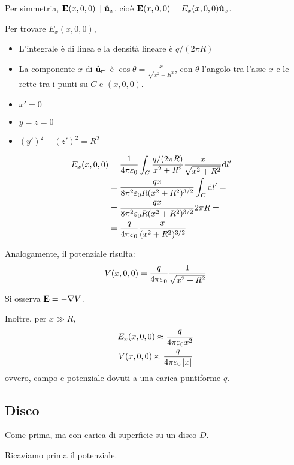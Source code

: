 Per simmetria, $\mathbf{E}(x, 0, 0) \parallel \hat{\mathbf{u}}_{x}$, cioè $\mathbf{E}(x, 0, 0) = E_x(x, 0, 0) \hat{\mathbf{u}}_{x}$.

Per trovare $E_x(x, 0, 0)$,
\begin{itemize}
    \item L'integrale è di linea e la densità lineare è $q / (2\pi R)$
    \item La componente $x$ di $\hat{\mathbf{u}}_{\mathbf{r}'}$ è $\cos \theta = \frac{x}{\sqrt{x^2 + R^2}}$, con $\theta$ l'angolo tra l'asse $x$ e le rette tra i punti su $C$ e $(x, 0, 0)$.
    \item $x' = 0$
    \item $y = z = 0$
    \item $(y')^2 + (z')^2 = R^2$
\end{itemize}

\begin{equation}
\begin{aligned}
    E_x(x, 0, 0) & = \frac{1}{4\pi\varepsilon_0} \int_C \frac{q/(2 \pi R)}{x^2 + R^2} \frac{x}{\sqrt{x^2 + R^2}} \mathrm{d} l' = \\
    & = \frac{qx}{8\pi^2\varepsilon_0 R (x^2 + R^2)^{3/2}} \int_C \mathrm{d} l' = \\
    & = \frac{qx}{8\pi^2\varepsilon_0 R (x^2 + R^2)^{3/2}} 2\pi R = \\
    & = \frac{q}{4\pi\varepsilon_0} \frac{x}{(x^2 + R^2)^{3/2}}
\end{aligned}
\end{equation}

Analogamente, il potenziale risulta:
\begin{equation}
    V(x, 0, 0) = \frac{q}{4\pi\varepsilon_0} \frac{1}{\sqrt{x^2 + R^2}}
\end{equation}

Si osserva $\mathbf{E} = - \nabla V$.

Inoltre, per $x \gg R$,
\begin{gather}
    E_x(x, 0, 0) \approx \frac{q}{4\pi\varepsilon_0 x^2} \\
    V(x, 0, 0) \approx \frac{q}{4\pi\varepsilon_0 \left\lvert x \right\rvert} \\
\end{gather}
ovvero, campo e potenziale dovuti a una carica puntiforme $q$.

\subsection{Disco}

Come prima, ma con carica di superficie su un disco $D$.

Ricaviamo prima il potenziale.

